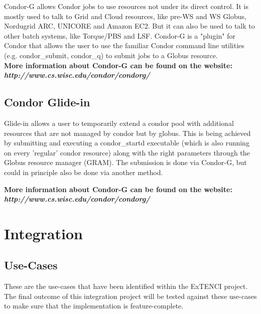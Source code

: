    Condor-G allows Condor jobs to use resources not under its direct
    control. It is mostly used to talk to Grid and Cloud resources, like
    pre-WS and WS Globus, Nordugrid ARC, UNICORE and Amazon EC2. But it
    can also be used to talk to other batch systems, like Torque/PBS and
    LSF. Condor-G is a "plugin" for Condor that allows the user to use
    the familiar Condor command line utilities  (e.g. condor\_submit,
    condor\_q) to submit jobs to a Globus resource.\\[1em]
   
  
   
    \textbf{More information about Condor-G can be found on the
    website: \\ \textit{http://www.cs.wisc.edu/condor/condorg/}}
   
   \vfill %
    


    
	
\subsection{Condor Glide-in}

    Glide-in allows a user to temporarily extend a condor pool with
    additional resources that are not managed by condor but by globus.
    This is being achieved by submitting and executing a condor\_startd
    executable (which is also running on every 'regular' condor
    resource) along with the right parameters through the Globus
    resource manager (GRAM). The submission is done via Condor-G, but
    could in principle also be done via another method.

    \textbf{More information about Condor-G can be found on the
    website: \\ \textit{http://www.cs.wisc.edu/condor/condorg/}}

\pagebreak

\section {Integration}

\subsection{Use-Cases}
These are the use-cases that have been identified within the ExTENCI project. The
final outcome of this integration project will be tested against these use-cases
to make sure that the implementation is feature-complete.

